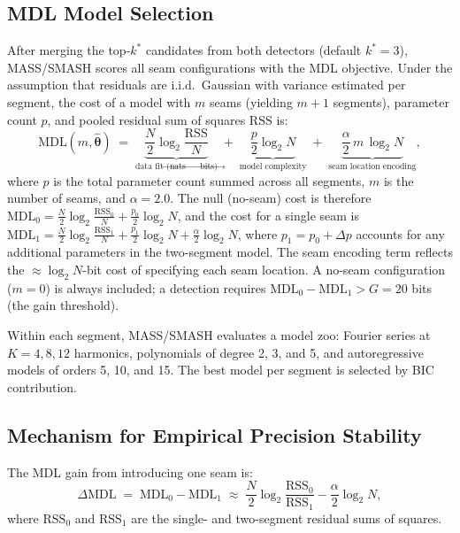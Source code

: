 \documentclass[12pt,letterpaper]{article}
\newcommand{\MDL}{\mathrm{MDL}}
\newcommand{\RSS}{\mathrm{RSS}}
\begin{document}
\subsection{MDL Model Selection}
\label{subsec:mdl}

After merging the top-$k^*$ candidates from both detectors (default $k^*=3$),
MASS/SMASH scores all seam configurations with the MDL objective.
Under the assumption that residuals are i.i.d.\ Gaussian with variance
estimated per segment, the cost of a model with $m$ seams (yielding $m+1$
segments), parameter count $p$, and pooled residual sum of squares $\RSS$ is:
\begin{equation}
  \MDL(m, \hat{\boldsymbol{\theta}}) \;=\;
    \underbrace{\frac{N}{2}\log_2\frac{\RSS}{N}}_{\text{data fit (nats $\to$ bits)}}
    \;+\;
    \underbrace{\frac{p}{2}\log_2 N}_{\text{model complexity}}
    \;+\;
    \underbrace{\frac{\alpha}{2}\,m\,\log_2 N}_{\text{seam location encoding}},
  \label{eq:mdl}
\end{equation}
where $p$ is the total parameter count summed across all segments, $m$ is
the number of seams, and $\alpha = 2.0$.
The null (no-seam) cost is therefore
$\MDL_0 = \frac{N}{2}\log_2\frac{\RSS_0}{N} + \frac{p_0}{2}\log_2 N$,
and the cost for a single seam is
$\MDL_1 = \frac{N}{2}\log_2\frac{\RSS_1}{N} + \frac{p_1}{2}\log_2 N +
\frac{\alpha}{2}\log_2 N$,
where $p_1 = p_0 + \Delta p$ accounts for any additional parameters in the
two-segment model.
The seam encoding term reflects the $\approx\log_2 N$-bit cost of specifying
each seam location.
A no-seam configuration ($m=0$) is always included; a detection requires
$\MDL_0 - \MDL_1 > G = 20$ bits (the gain threshold).

Within each segment, MASS/SMASH evaluates a model zoo: Fourier series at
$K = 4, 8, 12$ harmonics, polynomials of degree 2, 3, and 5, and
autoregressive models of orders 5, 10, and 15.
The best model per segment is selected by BIC contribution.

\subsection{Mechanism for Empirical Precision Stability}
\label{subsec:stability}

The MDL gain from introducing one seam is:
\begin{equation}
  \Delta\MDL \;=\; \MDL_0 - \MDL_1 \;\approx\;
    \frac{N}{2}\log_2\frac{\RSS_0}{\RSS_1} - \frac{\alpha}{2}\log_2 N,
  \label{eq:gain}
\end{equation}
where $\RSS_0$ and $\RSS_1$ are the single- and two-segment residual sums
of squares.
\end{document}
